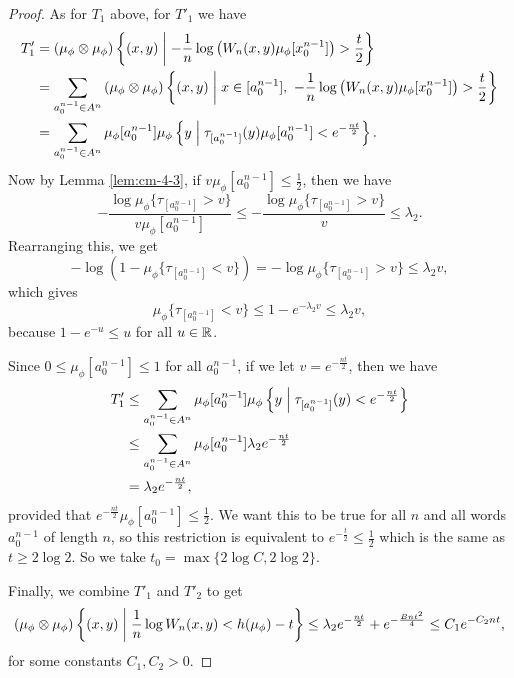 \begin{theorem}
\begin{proof}
		As for $T_1$ above, for $T'_1$ we have
		\begin{align*}
			T'_1 &= (\mu_\phi \otimes \mu_\phi)\left\{(x, y) \midmid -\frac{1}{n}\log\left(W_n(x, y) \mu_\phi[x_0^{n - 1}]\right) > \frac{t}{2}\right\} \\
				&= \sum_{a_0^{n - 1} \in A^n}{(\mu_\phi \otimes \mu_\phi)\left\{(x, y) \midmid x \in [a_0^{n - 1}],\ -\frac{1}{n}\log\left(W_n(x, y) \mu_\phi[x_0^{n - 1}]\right) > \frac{t}{2}\right\}} \\
				&= \sum_{a_0^{n - 1} \in A^n} \mu_\phi[a_0^{n - 1}]\mu_\phi\left\{y \midmid \tau_{[a_0^{n - 1}]}(y) \mu_\phi[a_0^{n - 1}] < e^{-\frac{nt}{2}}\right\}.
		\end{align*}
		Now by Lemma \ref{lem:cm-4-3}, if $v\mu_\phi[a_0^{n - 1}] \leq \frac{1}{2}$, then we have
		\[
			-\frac{\log{\mu_\phi\{\tau_{[a_0^{n - 1}]} > v\}}}{v\mu_\phi[a_0^{n - 1}]} \leq -\frac{\log{\mu_\phi\{\tau_{[a_0^{n - 1}]} > v\}}}{v} \leq \lambda_2.
		\]
		Rearranging this, we get
		\[
			-\log\left(1 - \mu_\phi\{\tau_{[a_0^{n - 1}]} < v\}\right) = -\log{\mu_\phi\{\tau_{[a_0^{n - 1}]} > v\}} \leq \lambda_2 v,
		\]
		which gives
		\[
			\mu_\phi\{\tau_{[a_0^{n - 1}]} < v\} \leq 1 - e^{-\lambda_2 v} \leq \lambda_2 v,
		\]
		because $1 - e^{-u} \leq u$ for all $u \in \mathbb{R}$.
		
		Since $0 \leq \mu_\phi[a_0^{n - 1}] \leq 1$ for all $a_0^{n - 1}$, if we let $v = e^{-\frac{nt}{2}}$, then we have
		\begin{align*}
			T'_1 &\leq \sum_{a_0^{n - 1} \in A^n} \mu_\phi[a_0^{n - 1}]\mu_\phi\left\{y \mathrel{}\middle|\mathrel{} \tau_{[a_0^{n - 1}]}(y) < e^{-\frac{nt}{2}}\right\} \\
				&\leq \sum_{a_0^{n - 1} \in A^n} \mu_\phi[a_0^{n - 1}] \lambda_2 e^{-\frac{nt}{2}} \\
				&= \lambda_2 e^{-\frac{nt}{2}},
		\end{align*}
		provided that $e^{-\frac{nt}{2}}\mu_\phi[a_0^{n - 1}] \leq \frac{1}{2}$. We want this to be true for all $n$ and all words $a_0^{n - 1}$ of length $n$, so this restriction is equivalent to $e^{-\frac{t}{2}} \leq \frac{1}{2}$ which is the same as $t \geq 2\log{2}$. So we take $t_0 = \max\{2\log{C}, 2 \log{2}\}$.
		
		Finally, we combine $T'_1$ and $T'_2$ to get
		\[
			(\mu_\phi \otimes \mu_\phi)\left\{(x, y) \mathrel{}\middle|\mathrel{} \frac{1}{n}\log{W_n(x, y)} < h(\mu_\phi) - t\right\} \leq \lambda_2 e^{-\frac{nt}{2}} + e^{-\frac{Bnt^2}{4}} \leq C_1e^{-C_2 nt},
		\]
		for some constants $C_1, C_2 > 0$.
	\end{proof}
\end{theorem}